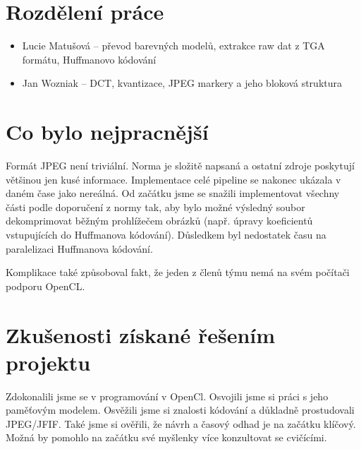 \documentclass[11pt,a4paper]{article}
\begin{document}
\section{Rozdělení práce}
\begin{itemize}
\item Lucie Matušová -- převod barevných modelů, extrakce raw dat z TGA formátu, Huffmanovo kódování
\item Jan Wozniak -- DCT, kvantizace, JPEG markery a jeho bloková struktura
\end{itemize}

\section{Co bylo nejpracnější}

Formát JPEG není triviální.  Norma \cite{t81} je složitě napsaná a ostatní zdroje poskytují většinou jen kusé informace. Implementace celé pipeline se nakonec ukázala v daném čase jako nereálná. Od začátku jsme se snažili implementovat všechny části podle doporučení z normy tak, aby bylo možné výsledný soubor dekomprimovat běžným prohlížečem obrázků (např. úpravy koeficientů vstupujících do Huffmanova kódování). Důsledkem byl nedostatek času na paralelizaci Huffmanova kódování.

Komplikace také způsoboval fakt, že jeden z členů týmu nemá na svém počítači podporu OpenCL.

\section{Zkušenosti získané řešením projektu}
Zdokonalili jsme se v programování v OpenCl. Osvojili jsme si práci s jeho paměťovým modelem. Osvěžili jsme si znalosti kódování a důkladně prostudovali JPEG/JFIF. Také jsme si ověřili, že návrh a časový odhad  je na začátku klíčový. Možná by pomohlo na začátku své myšlenky více konzultovat se cvičícími.

\end{document}
